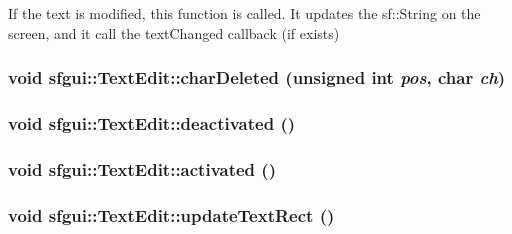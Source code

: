 If the text is modified, this function is called. It updates the sf::String on the screen, and it call the textChanged callback (if exists) \hypertarget{classsfgui_1_1TextEdit_8c3d822835999b2b0a38c1ef95eca4ff}{
\subsubsection[charDeleted]{\setlength{\rightskip}{0pt plus 5cm}void sfgui::TextEdit::charDeleted (unsigned int {\em pos}, \/  char {\em ch})}}
\label{classsfgui_1_1TextEdit_8c3d822835999b2b0a38c1ef95eca4ff}


\hypertarget{classsfgui_1_1TextEdit_c5ff761e3933294b46892db32e62b9f6}{
\subsubsection[deactivated]{\setlength{\rightskip}{0pt plus 5cm}void sfgui::TextEdit::deactivated ()}}
\label{classsfgui_1_1TextEdit_c5ff761e3933294b46892db32e62b9f6}


\hypertarget{classsfgui_1_1TextEdit_c009c601675801f2039d8f526e6fc921}{
\subsubsection[activated]{\setlength{\rightskip}{0pt plus 5cm}void sfgui::TextEdit::activated ()}}
\label{classsfgui_1_1TextEdit_c009c601675801f2039d8f526e6fc921}


\hypertarget{classsfgui_1_1TextEdit_cd1f4ab301db3775216a85066859a647}{
\subsubsection[updateTextRect]{\setlength{\rightskip}{0pt plus 5cm}void sfgui::TextEdit::updateTextRect ()}}
\label{classsfgui_1_1TextEdit_cd1f4ab301db3775216a85066859a647}




